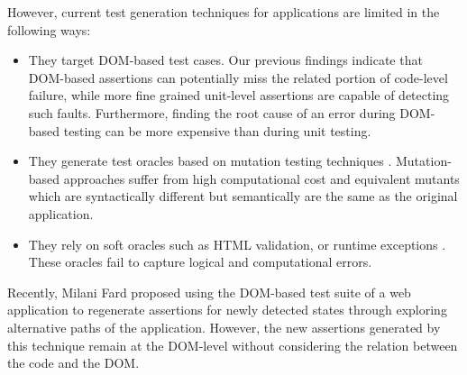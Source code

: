 However, current test generation techniques for \javascript applications are limited in the following ways:
\begin{itemize}[noitemsep]
\item They target DOM-based test cases. Our previous findings \cite{mirshokraie:icst15} indicate that DOM-based assertions can potentially miss the related portion of
code-level failure, while more fine grained unit-level assertions are capable of detecting such faults. Furthermore, finding the root cause of an error during DOM-based testing can be more expensive than during unit testing. 
\item They generate test oracles based on mutation testing techniques \cite{mirshokraie:icst15, fraser:tse12}. Mutation-based approaches suffer from high computational cost and equivalent mutants which are syntactically different but semantically are the same as the original application.
\item They rely on soft oracles such as HTML validation, or runtime exceptions \cite{artzi:icse11}. These oracles fail to capture logical and computational errors.  
\end{itemize}
Recently, Milani Fard \etal \cite{milanifard:ase14} proposed using the DOM-based test suite of a web application to regenerate assertions for newly detected states through exploring alternative paths of the application. However, the new assertions generated by this technique remain at the DOM-level without considering the relation between the \javascript code and the DOM.

